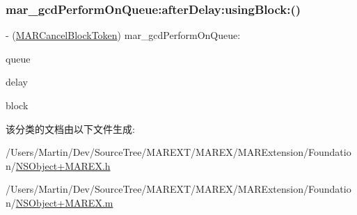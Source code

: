 \subsubsection{\texorpdfstring{mar\+\_\+gcd\+Perform\+On\+Queue\+:after\+Delay\+:using\+Block\+:()}{mar\_gcdPerformOnQueue:afterDelay:usingBlock:()}\hspace{0.1cm}{\footnotesize\ttfamily [3/3]}}
{\footnotesize\ttfamily -\/ (\hyperlink{_n_s_object_09_m_a_r_e_x_8h_aefb8384298417c24573cc88fde04d1a7}{M\+A\+R\+Cancel\+Block\+Token}) mar\+\_\+gcd\+Perform\+On\+Queue\+: \begin{DoxyParamCaption}\item[{(dispatch\+\_\+queue\+\_\+t)}]{queue }\item[{afterDelay:(N\+S\+Time\+Interval)}]{delay }\item[{usingBlock:(void($^\wedge$)(id))}]{block }\end{DoxyParamCaption}\hspace{0.3cm}{\ttfamily [implementation]}}



该分类的文档由以下文件生成\+:\begin{DoxyCompactItemize}
\item 
/\+Users/\+Martin/\+Dev/\+Source\+Tree/\+M\+A\+R\+E\+X\+T/\+M\+A\+R\+E\+X/\+M\+A\+R\+Extension/\+Foundation/\hyperlink{_n_s_object_09_m_a_r_e_x_8h}{N\+S\+Object+\+M\+A\+R\+E\+X.\+h}\item 
/\+Users/\+Martin/\+Dev/\+Source\+Tree/\+M\+A\+R\+E\+X\+T/\+M\+A\+R\+E\+X/\+M\+A\+R\+Extension/\+Foundation/\hyperlink{_n_s_object_09_m_a_r_e_x_8m}{N\+S\+Object+\+M\+A\+R\+E\+X.\+m}\end{DoxyCompactItemize}

